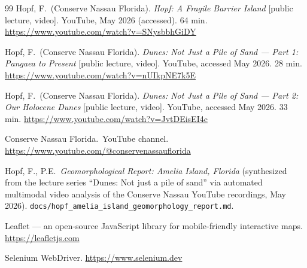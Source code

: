 \documentclass[11pt]{article}
\begin{document}
\begin{thebibliography}{99}
Hopf, F.\ (Conserve Nassau Florida).
\emph{Hopf: A Fragile Barrier Island} [public lecture, video].
YouTube, May 2026 (accessed). 64 min.
\url{https://www.youtube.com/watch?v=SNysbbhGiDY}

Hopf, F.\ (Conserve Nassau Florida).
\emph{Dunes: Not Just a Pile of Sand --- Part 1: Pangaea to Present} [public
lecture, video]. YouTube, accessed May 2026. 28 min.
\url{https://www.youtube.com/watch?v=nUIkpNE7k5E}

Hopf, F.\ (Conserve Nassau Florida).
\emph{Dunes: Not Just a Pile of Sand --- Part 2: Our Holocene Dunes} [public
lecture, video]. YouTube, accessed May 2026. 33 min.
\url{https://www.youtube.com/watch?v=JvtDEisEI4c}

Conserve Nassau Florida.\ YouTube channel.
\url{https://www.youtube.com/@conservenassauflorida}

Hopf, F., P.E.\ \emph{Geomorphological Report: Amelia Island, Florida}
(synthesized from the lecture series ``Dunes: Not just a pile of sand''
via automated multimodal video analysis of the Conserve Nassau YouTube
recordings, May 2026).
\texttt{docs/hopf\_amelia\_island\_geomorphology\_report.md}.

Leaflet --- an open-source JavaScript library for mobile-friendly interactive
maps. \url{https://leafletjs.com}

Selenium WebDriver. \url{https://www.selenium.dev}

\end{thebibliography}
\end{document}
